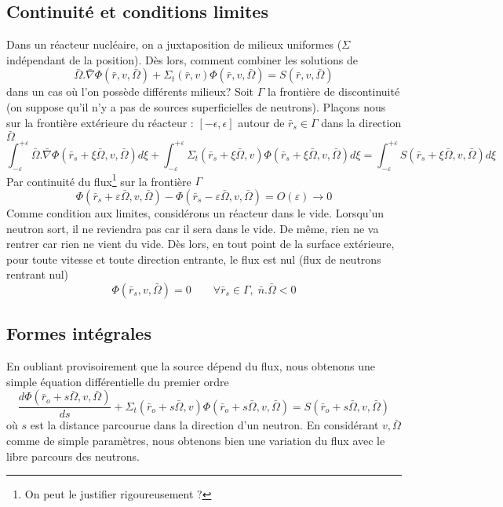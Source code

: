 \subsection{Continuité et conditions limites}
Dans un réacteur nucléaire, on a juxtaposition de milieux uniformes ($\Sigma$ indépendant de la 
position). Dès lors, comment combiner les solutions de
\begin{equation}
\bar \Omega .\bar \nabla \varPhi (\bar r,v,\bar \Omega ) + {\Sigma _t}(\bar r,v)\varPhi (\bar r,v,\bar \Omega ) = S(\bar r,v,\bar \Omega )
\end{equation}
dans un cas où l'on possède différents milieux? Soit $\Gamma$ la frontière de discontinuité (on 
suppose qu'il n'y a pas de sources superficielles de neutrons). Plaçons nous sur la frontière 
extérieure du réacteur : $[-\epsilon,\epsilon]$ autour de $\bar r_s\in\Gamma$ dans la direction 
$\bar\Omega$
\begin{equation}
\int_{ - \varepsilon }^{ + \varepsilon }    \bar \Omega .\bar \nabla \varPhi ({\bar r_s} + \xi \bar \Omega ,v,\bar \Omega )d\xi  + \int_{ - \varepsilon }^{ + \varepsilon }    {\Sigma _t}({\bar r_s} + \xi \bar \Omega ,v)\varPhi ({\bar r_s} + \xi \bar \Omega ,v,\bar \Omega )d\xi  = \int_{ - \varepsilon }^{ + \varepsilon }    S({\bar r_s} + \xi \bar \Omega ,v,\bar \Omega )d\xi 
\end{equation}
Par continuité du flux\footnote{On peut le justifier rigoureusement ?} sur la frontière $\Gamma$
\begin{equation}
\varPhi ({\bar r_s} + \varepsilon \bar \Omega ,v,\bar \Omega ) - \varPhi ({\bar r_s} - \varepsilon \bar \Omega ,v,\bar \Omega ) = O(\varepsilon ) \rightarrow 0
\end{equation}
Comme condition aux limites, considérons un réacteur dans le vide. Lorsqu'un neutron sort, il ne 
reviendra pas car il sera dans le vide. De même, rien ne va rentrer car rien ne vient du vide. Dès 
lors, en tout point de la surface extérieure, pour toute vitesse et toute direction entrante, le 
flux est nul (flux de neutrons rentrant nul)
\begin{equation}
\varPhi ({\bar r_s},v,\bar \Omega ) = 0\quad \quad \forall {\bar r_s} \in \Gamma ,\;\bar n.\bar \Omega  < 0
\end{equation}

\subsection{Formes intégrales}
En oubliant provisoirement que la source dépend du flux, nous obtenons une simple équation 
différentielle du premier ordre
\begin{equation}
\frac{{d\varPhi ({{\bar r}_o} + s\bar \Omega ,v,\bar \Omega )}}{{ds}} + {\Sigma _t}({\bar r_o} + s\bar \Omega ,v)\varPhi ({\bar r_o} + s\bar \Omega ,v,\bar \Omega ) = S({\bar r_o} + s\bar \Omega ,v,\bar \Omega )
\end{equation}
où $s$ est la distance parcourue dans la direction d'un neutron. En considérant $v, \bar\Omega$ comme 
de simple paramètres, nous obtenons bien une variation du flux avec le libre parcours des neutrons.\\

